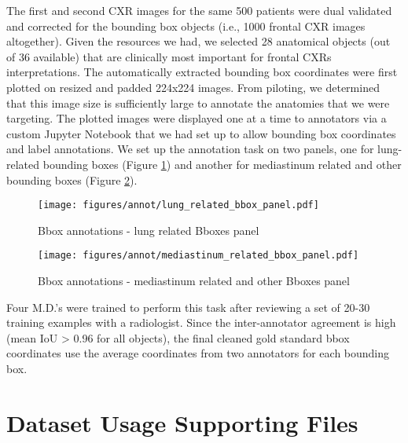 The first and second CXR images for the same 500 patients were dual validated and corrected for the bounding box objects (i.e., 1000 frontal CXR images altogether). Given the resources we had, we selected 28 anatomical objects (out of 36 available) that are clinically most important for frontal CXRs interpretations. The automatically extracted bounding box coordinates were first plotted on resized and padded 224x224 images. From piloting, we determined that this image size is sufficiently large to annotate the anatomies that we were targeting. The plotted images were displayed one at a time to annotators via a custom Jupyter Notebook that we had set up to allow bounding box coordinates and label annotations. We set up the annotation task on two panels, one for %
lung-related bounding boxes (Figure \ref{fig:bboxes-lung-panel}) and another for %
mediastinum related and other bounding boxes (Figure \ref{fig:bboxes-mediastinum-panel}). 

\begin{figure}[!ht]
\centering
\texttt{[image: figures/annot/lung\_related\_bbox\_panel.pdf]}
\caption{Bbox annotations - lung related Bboxes panel}
\label{fig:bboxes-lung-panel}
\end{figure}

\begin{figure}[!ht]
\centering
\texttt{[image: figures/annot/mediastinum\_related\_bbox\_panel.pdf]}
\caption{Bbox annotations - mediastinum related and other Bboxes panel}
\label{fig:bboxes-mediastinum-panel}
\end{figure}

Four M.D.'s were trained to perform this task after reviewing a set of 20-30 training examples with a radiologist. Since the inter-annotator agreement is high (mean IoU > 0.96 for all objects), the final cleaned %
gold standard bbox coordinates use the average coordinates from two annotators for each bounding box.


\newpage
\section{Dataset Usage Supporting Files}
\label{gold_supp}


